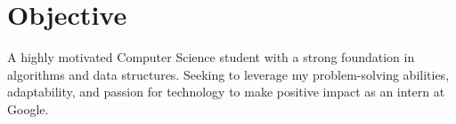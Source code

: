 \section{Objective}
A highly motivated Computer Science student with a strong foundation in algorithms and data structures. Seeking to leverage my problem-solving abilities, adaptability, and passion for technology to make positive impact as an intern at Google.

\vspace{1em}
